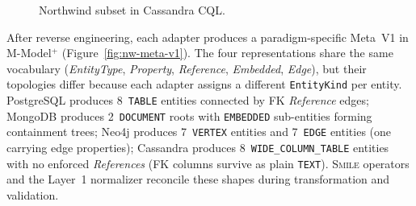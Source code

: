 \begin{figure}[htbp]
{}
  \caption{Northwind subset in Cassandra CQL.}
  \label{fig:nw-cass}
  \end{figure}

  After reverse engineering, each adapter produces a paradigm-specific
  Meta~V1 in M-Model$^{+}$ (Figure~\ref{fig:nw-meta-v1}). The four
  representations share the same vocabulary
  (\textit{EntityType}, \textit{Property}, \textit{Reference},
  \textit{Embedded}, \textit{Edge}), but their topologies differ
  because each adapter assigns a different \texttt{EntityKind} per
  entity. PostgreSQL produces 8~\texttt{TABLE} entities connected by
  FK \textit{Reference} edges; MongoDB produces 2~\texttt{DOCUMENT}
  roots with \texttt{EMBEDDED} sub-entities forming containment trees;
  Neo4j produces 7~\texttt{VERTEX} entities and 7~\texttt{EDGE}
  entities (one carrying edge properties); Cassandra produces
  8~\texttt{WIDE\_COLUMN\_TABLE} entities with no enforced
  \textit{References} (FK columns survive as plain \texttt{TEXT}).
  \textsc{Smile} operators and the Layer~1 normalizer reconcile these
  shapes during transformation and validation.

